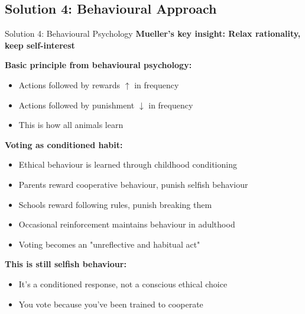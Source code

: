 \documentclass[10pt]{beamer}
\begin{document}
\subsection{Solution 4: Behavioural Approach}

\begin{frame}{Solution 4: Behavioural Psychology}
\textbf{Mueller's key insight: Relax rationality, keep self-interest}


\textbf{Basic principle from behavioural psychology:}
\begin{itemize}
\item Actions followed by rewards $\uparrow$ in frequency
\item Actions followed by punishment $\downarrow$ in frequency
\item This is how all animals learn
\end{itemize}


\textbf{Voting as conditioned habit:}
\begin{itemize}
\item Ethical behaviour is learned through childhood conditioning
\item Parents reward cooperative behaviour, punish selfish behaviour
\item Schools reward following rules, punish breaking them
\item Occasional reinforcement maintains behaviour in adulthood
\item \alert{Voting becomes an "unreflective and habitual act"}
\end{itemize}


\textbf{This is still selfish behaviour:}
\begin{itemize}
\item It's a conditioned response, not a conscious ethical choice
\item You vote because you've been trained to cooperate
\end{itemize}
\end{frame}
\end{document}
